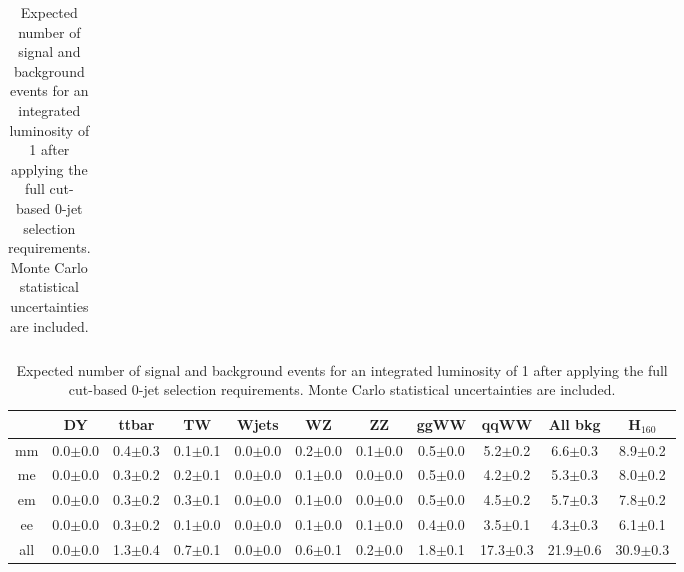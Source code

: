 \begin{table}[!ht]
\begin{center}
{\begin{tabular} {|c|c|c|c|c|c|c|c|c||c||c|}
 \hline
  \end{tabular}
  }
 {\footnotesize
  \begin{tabular} {|c|c|c|c|c|c|c|c|c||c||c|}
\hline
  & DY & ttbar & TW & Wjets & WZ & ZZ & ggWW & qqWW & {\bf All bkg} & {\bf H$_{160}$}\\
  \hline
  \hline
  mm & 0.0$\pm$0.0 &  0.4$\pm$0.3 &  0.1$\pm$0.1 &  0.0$\pm$0.0 &  0.2$\pm$0.0 &  0.1$\pm$0.0 &  0.5$\pm$0.0 &  5.2$\pm$0.2 &  6.6$\pm$0.3 & 8.9$\pm$0.2 \\
  me & 0.0$\pm$0.0 &  0.3$\pm$0.2 &  0.2$\pm$0.1 &  0.0$\pm$0.0 &  0.1$\pm$0.0 &  0.0$\pm$0.0 &  0.5$\pm$0.0 &  4.2$\pm$0.2 &  5.3$\pm$0.3 & 8.0$\pm$0.2 \\
  em & 0.0$\pm$0.0 &  0.3$\pm$0.2 &  0.3$\pm$0.1 &  0.0$\pm$0.0 &  0.1$\pm$0.0 &  0.0$\pm$0.0 &  0.5$\pm$0.0 &  4.5$\pm$0.2 &  5.7$\pm$0.3 & 7.8$\pm$0.2 \\
  ee & 0.0$\pm$0.0 &  0.3$\pm$0.2 &  0.1$\pm$0.0 &  0.0$\pm$0.0 &  0.1$\pm$0.0 &  0.1$\pm$0.0 &  0.4$\pm$0.0 &  3.5$\pm$0.1 &  4.3$\pm$0.3 & 6.1$\pm$0.1 \\
 \hline
 all & 0.0$\pm$0.0 &  1.3$\pm$0.4 &  0.7$\pm$0.1 &  0.0$\pm$0.0 &  0.6$\pm$0.1 &  0.2$\pm$0.0 &  1.8$\pm$0.1 & 17.3$\pm$0.3 & 21.9$\pm$0.6 & 30.9$\pm$0.3 \\
 \hline
  \end{tabular}
  }
  \caption{Expected number of signal and background events for an 
  integrated luminosity of 1\ifb{} after 
  applying the full cut-based 0-jet selection requirements. Monte Carlo statistical uncertainties are 
  included.}
   \label{tab:cutbase_yeilds}
  \end{center}
\end{table}

